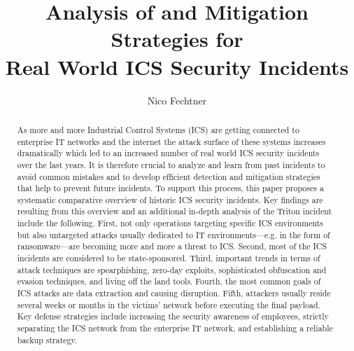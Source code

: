 \documentclass[runningheads]{llncs}
\begin{document}
%
\title{Analysis of and Mitigation Strategies for \\Real World ICS Security Incidents}
%
%
\author{Nico Fechtner}
%
%
%
\maketitle              %
%
\begin{abstract}
As more and more Industrial Control Systems (ICS) are getting connected to enterprise IT networks and the internet the attack surface of these systems increases dramatically which led to an increased number of real world ICS security incidents over the last years.
It is therefore crucial to analyze and learn from past incidents to avoid common mistakes and to develop efficient detection and mitigation strategies that help to prevent future incidents.
To support this process, this paper proposes a systematic comparative overview of historic ICS security incidents.
Key findings are resulting from this overview and an additional in-depth analysis of the Triton incident include the following.
First, not only operations targeting specific ICS environments but also untargeted attacks usually dedicated to IT environments---e.g. in the form of ransomware---are becoming more and more a threat to ICS.
Second, most of the ICS incidents are considered to be state-sponsored.
Third, important trends in terms of attack techniques are spearphishing, zero-day exploits, sophisticated obfuscation and evasion techniques, and living off the land tools.
Fourth, the most common goals of ICS attacks are data extraction and causing disruption.
Fifth, attackers usually reside several weeks or months in the victims' network before executing the final payload.
Key defense strategies include increasing the security awareness of employees, strictly separating the ICS network from the enterprise IT network, and establishing a reliable backup strategy.

\end{abstract}
%
%
%
\end{document}
